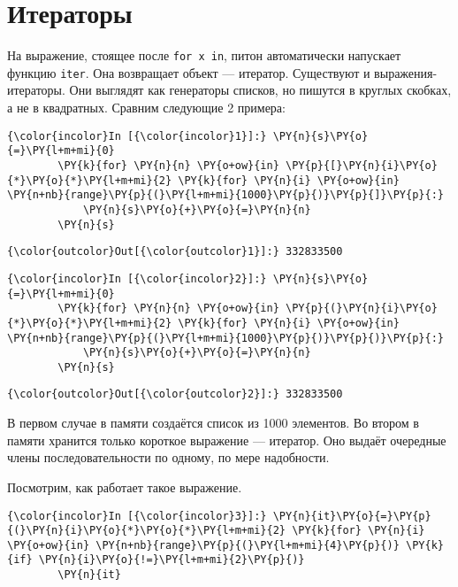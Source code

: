 \section{Итераторы}
\label{S107a}

На выражение, стоящее после \texttt{for\ x\ in}, питон автоматически
напускает функцию \texttt{iter}. Она возвращает объект --- итератор.
Существуют и выражения-итераторы. Они выглядят как генераторы списков,
но пишутся в круглых скобках, а не в квадратных. Сравним следующие 2
примера:

    \begin{Verbatim}[commandchars=\\\{\}]
{\color{incolor}In [{\color{incolor}1}]:} \PY{n}{s}\PY{o}{=}\PY{l+m+mi}{0}
        \PY{k}{for} \PY{n}{n} \PY{o+ow}{in} \PY{p}{[}\PY{n}{i}\PY{o}{*}\PY{o}{*}\PY{l+m+mi}{2} \PY{k}{for} \PY{n}{i} \PY{o+ow}{in} \PY{n+nb}{range}\PY{p}{(}\PY{l+m+mi}{1000}\PY{p}{)}\PY{p}{]}\PY{p}{:}
            \PY{n}{s}\PY{o}{+}\PY{o}{=}\PY{n}{n}
        \PY{n}{s}
\end{Verbatim}


\begin{Verbatim}[commandchars=\\\{\}]
{\color{outcolor}Out[{\color{outcolor}1}]:} 332833500
\end{Verbatim}
            
    \begin{Verbatim}[commandchars=\\\{\}]
{\color{incolor}In [{\color{incolor}2}]:} \PY{n}{s}\PY{o}{=}\PY{l+m+mi}{0}
        \PY{k}{for} \PY{n}{n} \PY{o+ow}{in} \PY{p}{(}\PY{n}{i}\PY{o}{*}\PY{o}{*}\PY{l+m+mi}{2} \PY{k}{for} \PY{n}{i} \PY{o+ow}{in} \PY{n+nb}{range}\PY{p}{(}\PY{l+m+mi}{1000}\PY{p}{)}\PY{p}{)}\PY{p}{:}
            \PY{n}{s}\PY{o}{+}\PY{o}{=}\PY{n}{n}
        \PY{n}{s}
\end{Verbatim}


\begin{Verbatim}[commandchars=\\\{\}]
{\color{outcolor}Out[{\color{outcolor}2}]:} 332833500
\end{Verbatim}
            
    В первом случае в памяти создаётся список из 1000 элементов. Во втором в
памяти хранится только короткое выражение --- итератор. Оно выдаёт
очередные члены последовательности по одному, по мере надобности.

Посмотрим, как работает такое выражение.

    \begin{Verbatim}[commandchars=\\\{\}]
{\color{incolor}In [{\color{incolor}3}]:} \PY{n}{it}\PY{o}{=}\PY{p}{(}\PY{n}{i}\PY{o}{*}\PY{o}{*}\PY{l+m+mi}{2} \PY{k}{for} \PY{n}{i} \PY{o+ow}{in} \PY{n+nb}{range}\PY{p}{(}\PY{l+m+mi}{4}\PY{p}{)} \PY{k}{if} \PY{n}{i}\PY{o}{!=}\PY{l+m+mi}{2}\PY{p}{)}
        \PY{n}{it}
\end{Verbatim}


